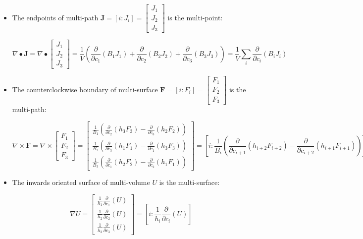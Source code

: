\begin{itemize}
\item The endpoints of multi-path \(\mathbf{J} = [i : J_i] = \begin{bmatrix} J_1 \\ J_2 \\ J_3 \end{bmatrix}\) is the multi-point:

\[\nabla \bullet \mathbf{J} = \nabla \bullet \begin{bmatrix} J_1 \\ J_2 \\ J_3 \end{bmatrix} = \frac{1}{V}\left(\frac{\partial}{\partial c_1}(B_1 J_1) + \frac{\partial}{\partial c_2}(B_2 J_2) + \frac{\partial}{\partial c_3}(B_3 J_3)\right) = \frac{1}{V}\sum_i \frac{\partial}{\partial c_i} (B_i J_i)\]


\item The counterclockwise boundary of multi-surface \(\mathbf{F} = [i : F_i] = \begin{bmatrix} F_1 \\ F_2 \\ F_3 \end{bmatrix}\) is the multi-path:

\[\nabla \times \mathbf{F} = \nabla \times \begin{bmatrix} F_1 \\ F_2 \\ F_3 \end{bmatrix} = \begin{bmatrix} \frac{1}{B_1}\left(\frac{\partial}{\partial c_2}(h_3 F_3) - \frac{\partial}{\partial c_3}(h_2 F_2)\right) \\ \frac{1}{B_2}\left(\frac{\partial}{\partial c_3}(h_1 F_1) - \frac{\partial}{\partial c_1}(h_3 F_3)\right) \\ \frac{1}{B_3}\left(\frac{\partial}{\partial c_1}(h_2 F_2) - \frac{\partial}{\partial c_2}(h_1 F_1)\right) \end{bmatrix} = \left[ i : \frac{1}{B_i}\left(\frac{\partial}{\partial c_{i+1}}(h_{i+2} F_{i+2}) - \frac{\partial}{\partial c_{i+2}}(h_{i+1} F_{i+1})\right) \right]\]


\item The inwards oriented surface of multi-volume \(U\) is the multi-surface:

\[\nabla U = \begin{bmatrix} \frac{1}{h_1}\frac{\partial}{\partial c_1}(U) \\ \frac{1}{h_2}\frac{\partial}{\partial c_2}(U) \\ \frac{1}{h_3}\frac{\partial}{\partial c_3}(U) \end{bmatrix} = \left[ i :  \frac{1}{h_i}\frac{\partial}{\partial c_i}(U)\right]\]
\end{itemize}




